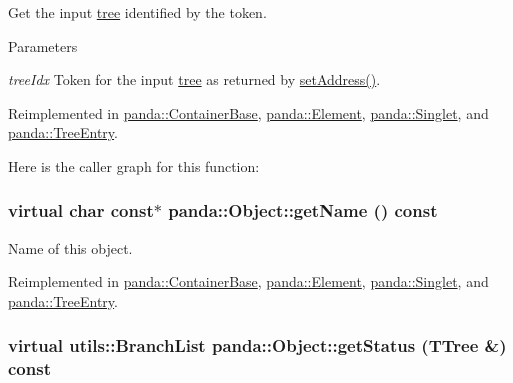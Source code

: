 Get the input \hyperlink{namespacepanda_1_1tree}{tree} identified by the token. 
\begin{DoxyParams}{Parameters}
\item[{\em treeIdx}]Token for the input \hyperlink{namespacepanda_1_1tree}{tree} as returned by \hyperlink{classpanda_1_1Object_aed9f9d3b6abe518dd27957de843b36b5}{setAddress()}. \end{DoxyParams}


Reimplemented in \hyperlink{classpanda_1_1ContainerBase_aee836fc160acb4244a2dab856e9bb97a}{panda::ContainerBase}, \hyperlink{classpanda_1_1Element_a015e9911602ca22405225d0584c39de3}{panda::Element}, \hyperlink{classpanda_1_1Singlet_ac0c8b93ca8f4085700bddb786bae4b02}{panda::Singlet}, and \hyperlink{classpanda_1_1TreeEntry_a3e0841eb1ddb6e85e37413e4866101b6}{panda::TreeEntry}.

Here is the caller graph for this function:\hypertarget{classpanda_1_1Object_a670b2150de796b6fc742fa9de30cd6b1}{
\subsubsection[{getName}]{\setlength{\rightskip}{0pt plus 5cm}virtual char const$\ast$ panda::Object::getName () const}}
\label{classpanda_1_1Object_a670b2150de796b6fc742fa9de30cd6b1}


Name of this object. 

Reimplemented in \hyperlink{classpanda_1_1ContainerBase_a1d34d04ba62ea436b805c73f3e5a7e04}{panda::ContainerBase}, \hyperlink{classpanda_1_1Element_a258c5be022395f98b13120cdab80fb51}{panda::Element}, \hyperlink{classpanda_1_1Singlet_a0cadb592bf3f3c40f26cb67a406b582e}{panda::Singlet}, and \hyperlink{classpanda_1_1TreeEntry_afbd2a566ad42c6f5e4ce0183cde65c20}{panda::TreeEntry}.\hypertarget{classpanda_1_1Object_ad575503e839f7aa6cc47434b3a24cb80}{
\subsubsection[{getStatus}]{\setlength{\rightskip}{0pt plus 5cm}virtual {\bf utils::BranchList} panda::Object::getStatus (TTree \&) const}}
\label{classpanda_1_1Object_ad575503e839f7aa6cc47434b3a24cb80}



